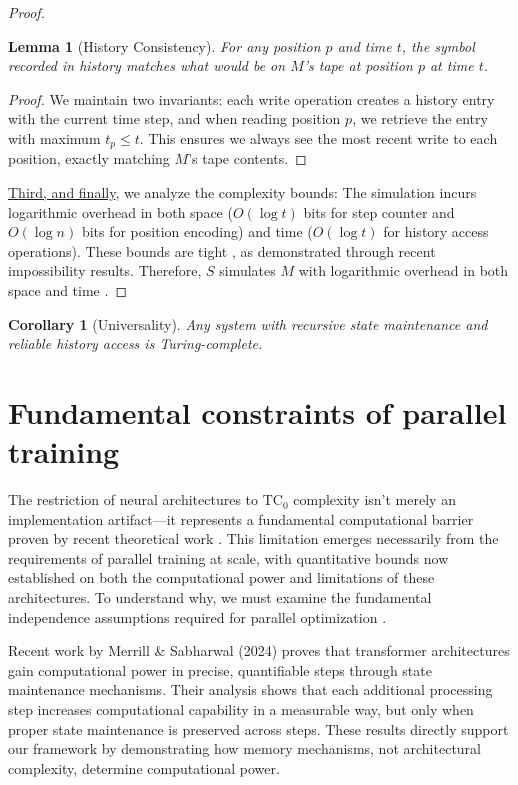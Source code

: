 \documentclass[12pt]{article}
\newtheorem{lemma}[theorem]{Lemma}
\newtheorem{corollary}[theorem]{Corollary}
\begin{document}
\begin{proof}
\begin{lemma}[History Consistency]
For any position $p$ and time $t$, the symbol recorded in history matches what would be on $M$'s tape at position $p$ at time $t$.
\end{lemma}

\begin{proof}
We maintain two invariants: each write operation creates a history entry with the current time step, and when reading position $p$, we retrieve the entry with maximum $t_p \leq t$.
This ensures we always see the most recent write to each position, exactly matching $M$'s tape contents.
\end{proof}

\vspace{0.5em}
\noindent\underline{Third, and finally}, we analyze the complexity bounds: The simulation incurs logarithmic overhead in both space ($O(\log t)$ bits for step counter and $O(\log n)$ bits for position encoding) and time ($O(\log t)$ for history access operations). These bounds are tight \cite{parzych2024memory,hhan2024new,boyle2024memory}, as demonstrated through recent impossibility results. Therefore, $S$ simulates $M$ with logarithmic overhead in both space and time \cite{savage1994space,vonkorff2019molecular,bennett1989time}.
\end{proof}

\begin{corollary}[Universality]
Any system with recursive state maintenance and reliable history access is Turing-complete.
\end{corollary}

\section{Fundamental constraints of parallel training}

The restriction of neural architectures to $\text{TC}_0$ complexity isn't merely an implementation artifact---it represents a fundamental computational barrier proven by recent theoretical work \cite{merrill2023parallelism,peng2024limitations}.
This limitation emerges necessarily from the requirements of parallel training at scale, with quantitative bounds now established on both the computational power and limitations of these architectures.
To understand why, we must examine the fundamental independence assumptions required for parallel optimization \cite{shallue2019measuring}.

Recent work by Merrill \& Sabharwal (2024) proves that transformer architectures gain computational power in precise, quantifiable steps through state maintenance mechanisms.
Their analysis shows that each additional processing step increases computational capability in a measurable way, but only when proper state maintenance is preserved across steps.
These results directly support our framework by demonstrating how memory mechanisms, not architectural complexity, determine computational power.
\end{document}
